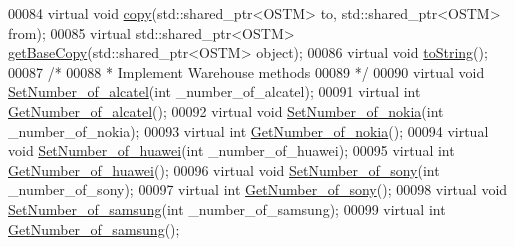 \begin{DoxyCode}
00084     \textcolor{keyword}{virtual} \textcolor{keywordtype}{void} \hyperlink{class_k_i_l_k_e_n_n_y___w_a36a02e862f3563fbab3c94dfec4a0934}{copy}(std::shared\_ptr<OSTM> to, std::shared\_ptr<OSTM> from);
00085     \textcolor{keyword}{virtual} std::shared\_ptr<OSTM> \hyperlink{class_k_i_l_k_e_n_n_y___w_ad8c5f7f6ac7689fa9acd6cafb0cb69a4}{getBaseCopy}(std::shared\_ptr<OSTM> \textcolor{keywordtype}{object});
00086     \textcolor{keyword}{virtual} \textcolor{keywordtype}{void} \hyperlink{class_k_i_l_k_e_n_n_y___w_aea627b4c0efd0f725363556afe1ad849}{toString}();
00087     \textcolor{comment}{/*}
00088 \textcolor{comment}{     * Implement Warehouse methods}
00089 \textcolor{comment}{     */}
00090     \textcolor{keyword}{virtual} \textcolor{keywordtype}{void} \hyperlink{class_k_i_l_k_e_n_n_y___w_ac4c3dbc9e74a4ae6c0a7e88d7a8f80a2}{SetNumber\_of\_alcatel}(\textcolor{keywordtype}{int} \_number\_of\_alcatel);
00091     \textcolor{keyword}{virtual} \textcolor{keywordtype}{int} \hyperlink{class_k_i_l_k_e_n_n_y___w_a8f23cfd2feb57a5b67f16d49c137820f}{GetNumber\_of\_alcatel}();
00092     \textcolor{keyword}{virtual} \textcolor{keywordtype}{void} \hyperlink{class_k_i_l_k_e_n_n_y___w_a3306af7f7a306f5198c6d78e6a54bf8f}{SetNumber\_of\_nokia}(\textcolor{keywordtype}{int} \_number\_of\_nokia);
00093     \textcolor{keyword}{virtual} \textcolor{keywordtype}{int} \hyperlink{class_k_i_l_k_e_n_n_y___w_ad1e54597be8ac03021520caf851981e4}{GetNumber\_of\_nokia}();
00094     \textcolor{keyword}{virtual} \textcolor{keywordtype}{void} \hyperlink{class_k_i_l_k_e_n_n_y___w_a2b89e05ada24ce0b7055f2b7cfb76e52}{SetNumber\_of\_huawei}(\textcolor{keywordtype}{int} \_number\_of\_huawei);
00095     \textcolor{keyword}{virtual} \textcolor{keywordtype}{int} \hyperlink{class_k_i_l_k_e_n_n_y___w_a0b0689da37856045c9325e6723f78d4b}{GetNumber\_of\_huawei}();
00096     \textcolor{keyword}{virtual} \textcolor{keywordtype}{void} \hyperlink{class_k_i_l_k_e_n_n_y___w_a6edadc355823944f30b94039abed1c9a}{SetNumber\_of\_sony}(\textcolor{keywordtype}{int} \_number\_of\_sony);
00097     \textcolor{keyword}{virtual} \textcolor{keywordtype}{int} \hyperlink{class_k_i_l_k_e_n_n_y___w_a804254083a84b05b320e5723c0568e6f}{GetNumber\_of\_sony}();
00098     \textcolor{keyword}{virtual} \textcolor{keywordtype}{void} \hyperlink{class_k_i_l_k_e_n_n_y___w_ac9ba94018b97ae9be58bde2690965612}{SetNumber\_of\_samsung}(\textcolor{keywordtype}{int} \_number\_of\_samsung);
00099     \textcolor{keyword}{virtual} \textcolor{keywordtype}{int} \hyperlink{class_k_i_l_k_e_n_n_y___w_ac73e56bbdb3915546b8774f260edc30e}{GetNumber\_of\_samsung}();

\end{DoxyCode}
